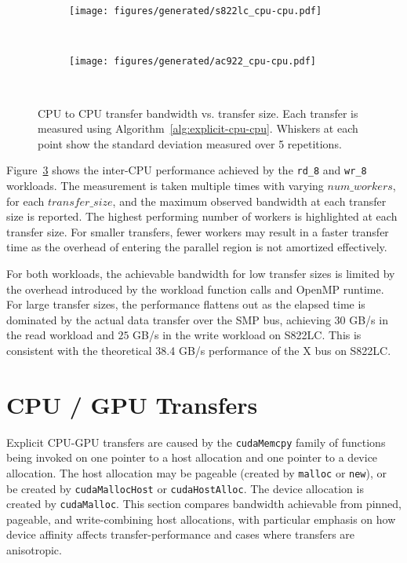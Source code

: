 \begin{figure}[H]
	\centering
	\begin{subfigure}[b]{0.31\textwidth}
		\texttt{[image: figures/generated/s822lc\_cpu-cpu.pdf]}
		\caption{}
		\label{fig:s822lc-cpu0-cpu1-dst}
	\end{subfigure}
	~
	\begin{subfigure}[b]{0.31\textwidth}
		\texttt{[image: figures/generated/ac922\_cpu-cpu.pdf]}
		\caption{}
		\label{fig:s822lc-cpu0-cpu1-dst}
	\end{subfigure}
	~
	\caption[CPU to CPU transfer bandwidth]{
		CPU to CPU transfer bandwidth vs. transfer size.
		Each transfer is measured using Algorithm~\ref{alg:explicit-cpu-cpu}.
		Whiskers at each point show the standard deviation measured over 5 repetitions.
	}
	\label{fig:cpu0-cpu1}
\end{figure}

Figure~\ref{fig:cpu0-cpu1} shows the inter-CPU performance achieved by the \texttt{rd\_8} and \texttt{wr\_8} workloads.
The measurement is taken multiple times with varying $num\_workers$, for each $transfer\_size$, and the maximum observed bandwidth at each transfer size is reported.
The highest performing number of workers is highlighted at each transfer size.
For smaller transfers, fewer workers may result in a faster transfer time as the overhead of entering the parallel region is not amortized effectively.

For both workloads, the achievable bandwidth for low transfer sizes is limited by the overhead introduced by the workload function calls and OpenMP runtime.
For large transfer sizes, the performance flattens out as the elapsed time is dominated by the actual data transfer over the SMP bus, achieving $30$ GB/s in the read workload and $25$ GB/s in the write workload on S822LC.
This is consistent with the theoretical 38.4 GB/s performance of the X bus on S822LC.


\section{CPU / GPU Transfers}
\label{sec:explicit-cpu-gpu}

Explicit CPU-GPU transfers are caused by the \texttt{cudaMemcpy} family of functions being invoked on one pointer to a host allocation and one pointer to a device allocation.
The host allocation may be pageable (created by \texttt{malloc} or \texttt{new}), or be created by \texttt{cudaMallocHost} or \texttt{cudaHostAlloc}.
The device allocation is created by \texttt{cudaMalloc}.
This section compares bandwidth achievable from pinned, pageable, and write-combining host allocations, with particular emphasis on how device affinity affects transfer-performance and cases where transfers are anisotropic.

